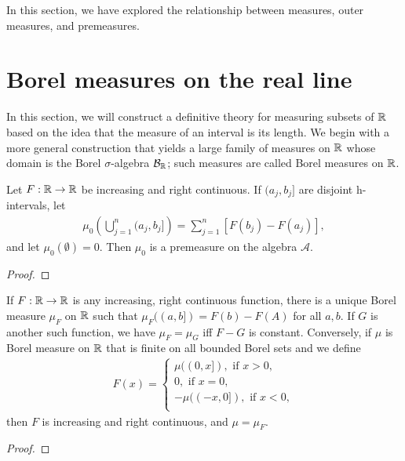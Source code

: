 In this section, we have explored the relationship between measures, outer measures, and premeasures.

\section{Borel measures on the real line}

In this section, we will construct a definitive theory for measuring subsets of $\mathbb{R}$ based on the idea that the measure of an interval is its length.
We begin with a more general construction that yields a large family of measures on $\mathbb{R}$ whose domain is the Borel $\sigma$-algebra $\mathcal{B}_{\mathbb{R}}$; such measures are called Borel measures on $\mathbb{R}$.

\begin{proposition}
    Let $F:\mathbb{R} \to \mathbb{R}$ be increasing and right continuous.
    If $(a_j, b_j]$ are disjoint h-intervals, let
    \begin{align}
        \mu_0 \left(\bigcup_{j=1}^{n} (a_j, b_j] \right) = \sum_{j=1}^{n} [F(b_j) - F(a_j)],
    \end{align}
    and let $\mu_0(\emptyset) = 0$.
    Then $\mu_0$ is a premeasure on the algebra $\mathcal{A}$.
\end{proposition}

\begin{proof}

\end{proof}

\begin{theorem}
    If $F: \mathbb{R} \to \mathbb{R}$ is any increasing, right continuous function, there is a unique Borel measure $\mu_F$ on $\mathbb{R}$ such that $\mu_F ((a,b]) = F(b) - F(A)$ for all $a, b$.
    If $G$ is another such function, we have $\mu_F = \mu_G$ iff $F-G$ is constant.
    Conversely, if $\mu$ is Borel measure on $\mathbb{R}$ that is finite on all bounded Borel sets and we define
    \begin{align}
        F(x) = \begin{cases}
            \mu((0, x]), \text{ if } x > 0, \\
            0, \text{ if } x = 0,\\
            -\mu((-x, 0]), \text{ if } x < 0, \\
        \end{cases}
    \end{align}
    then $F$ is increasing and right continuous, and $\mu = \mu_F$.
\end{theorem}

\begin{proof}
    
\end{proof}

